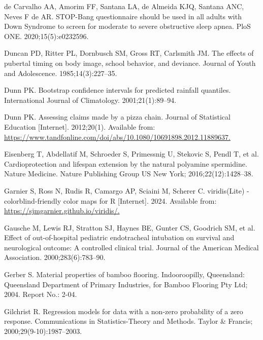 \documentclass[
  11pt,
  a4paper,
  krantz2]{krantz}
\newlength{\cslhangindent}
\newenvironment{CSLReferences}[2] %
 {\begin{list}{}{%
  \setlength{\itemindent}{0pt}
  \setlength{\leftmargin}{0pt}
  \setlength{\parsep}{0pt}
  \ifodd #1
   \setlength{\leftmargin}{\cslhangindent}
   \setlength{\itemindent}{-1\cslhangindent}
  \fi
  \setlength{\itemsep}{#2\baselineskip}}}
 {\end{list}}
\begin{document}
\begin{footnotesize}
\begin{CSLReferences}{1}{0}
{de Carvalho AA, Amorim FF, Santana LA, de Almeida KJQ, Santana ANC, Neves F de AR}. {STOP}-{B}ang questionnaire should be used in all adults with {D}own {S}yndrome to screen for moderate to severe obstructive sleep apnea. {PloS} {ONE}. 2020;15(5):e0232596.

Duncan PD, Ritter PL, Dornbusch SM, Gross RT, Carlsmith JM. The effects of pubertal timing on body image, school behavior, and deviance. Journal of Youth and Adolescence. 1985;14(3):227--35.

Dunn PK. Bootstrap confidence intervals for predicted rainfall quantiles. International Journal of Climatology. 2001;21(1):89--94.

Dunn PK. Assessing claims made by a pizza chain. Journal of Statistical Education {[}Internet{]}. 2012;20(1). Available from: \href{https://www.tandfonline.com/doi/abs/10.1080/10691898.2012.11889637}{https://www.tandfonline.com/doi/abs/10.1080/10691898.2012.11889637.}

{Eisenberg T, Abdellatif M, Schroeder S, Primessnig U, Stekovic S, Pendl T, et al.} Cardioprotection and lifespan extension by the natural polyamine spermidine. Nature Medicine. Nature Publishing Group US New York; 2016;22(12):1428--38.

Garnier S, Ross N, Rudis R, Camargo AP, Sciaini M, Scherer C. {viridis(Lite)} - colorblind-friendly color maps for {R} {[}Internet{]}. 2024. Available from: \href{https://sjmgarnier.github.io/viridis/}{https://sjmgarnier.github.io/viridis/.}

Gausche M, Lewis RJ, Stratton SJ, Haynes BE, Gunter CS, Goodrich SM, et al. Effect of out-of-hospital pediatric endotracheal intubation on survival and neurological outcome: A controlled clinical trial. Journal of the {A}merican Medical Association. 2000;283(6):783--90.

Gerber S. Material properties of bamboo flooring. {I}ndooroopilly, {Q}ueensland: {Q}ueensland Department of Primary Industries, for {B}amboo {F}looring {Pty} {Ltd}; 2004. Report No.: 2-04.

Gilchrist R. Regression models for data with a non-zero probability of a zero response. Communications in Statistics-Theory and Methods. Taylor \& Francis; 2000;29(9-10):1987--2003.


\end{CSLReferences}
\end{footnotesize}
\end{document}
